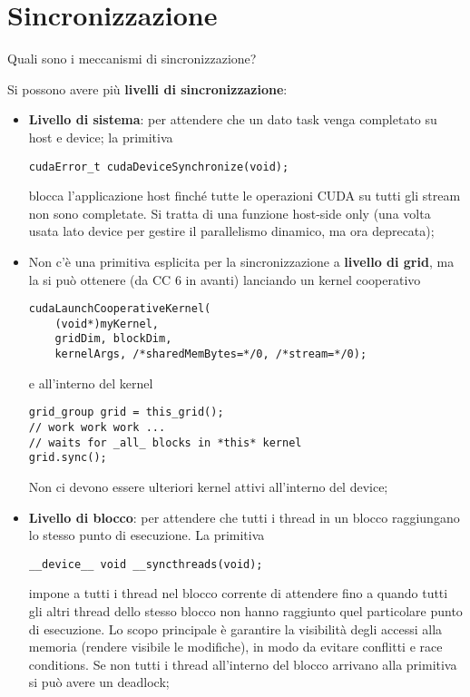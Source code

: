 \section{Sincronizzazione}

\begin{questions}
    \question Quali sono i meccanismi di sincronizzazione?
    
    \begin{solution}
        Si possono avere più \textbf{livelli di sincronizzazione}:
        \begin{itemize}
            \item \textbf{Livello di sistema}: per attendere che un dato task venga completato su host e device; la primitiva
            \begin{verbatim}
cudaError_t cudaDeviceSynchronize(void);
            \end{verbatim}
            blocca l'applicazione host finché tutte le operazioni CUDA su tutti gli stream non sono completate. Si tratta di una funzione host-side only (una volta usata lato device per gestire il parallelismo dinamico, ma ora deprecata);
            
            \item Non c'è una primitiva esplicita per la sincronizzazione a \textbf{livello di grid}, ma la si può ottenere (da CC 6 in avanti) lanciando un kernel cooperativo
            \begin{verbatim}
cudaLaunchCooperativeKernel(
    (void*)myKernel,
    gridDim, blockDim,
    kernelArgs, /*sharedMemBytes=*/0, /*stream=*/0);
            \end{verbatim}
            e all'interno del kernel
            \begin{verbatim}
grid_group grid = this_grid();
// work work work ...
// waits for _all_ blocks in *this* kernel
grid.sync();
            \end{verbatim}
            Non ci devono essere ulteriori kernel attivi all'interno del device;
            
            \item \textbf{Livello di blocco}: per attendere che tutti i thread in un blocco raggiungano lo stesso punto di esecuzione. La primitiva
            \begin{verbatim}
__device__ void __syncthreads(void);
            \end{verbatim}
            impone a tutti i thread nel blocco corrente di attendere fino a quando tutti gli altri thread dello stesso blocco non hanno raggiunto quel particolare punto di esecuzione. Lo scopo principale è garantire la visibilità degli accessi alla memoria (rendere visibile le modifiche), in modo da evitare conflitti e race conditions. Se non tutti i thread all'interno del blocco arrivano alla primitiva si può avere un deadlock;
            

\end{itemize}
\end{solution}
\end{questions}
